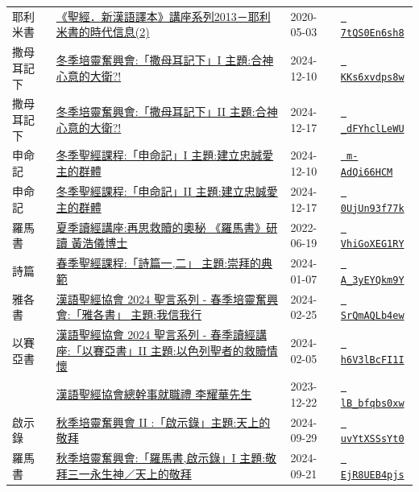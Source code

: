 \documentclass{book}
\begin{document}
{\begin{xltabular}{\textwidth}{|p{0.15\textwidth} p{0.6\textwidth}|p{0.07\textwidth} p{0.1\textwidth}|}
耶利米書   & \hyperref[sec:7tQS0En6sh8]{《聖經．新漢語譯本》講座系列2013－耶利米書的時代信息(2)} & 2020-05-03 & \href{https://youtube.com/watch?v=7tQS0En6sh8}{\texttt{ 7tQS0En6sh8}} \\
撒母耳記下   & \hyperref[sec:KKs6xvdps8w]{冬季培靈奮興會:「撒母耳記下」I  主題:合神心意的大衛?!} & 2024-12-10 & \href{https://youtube.com/watch?v=KKs6xvdps8w}{\texttt{ KKs6xvdps8w}} \\
撒母耳記下   & \hyperref[sec:_dFYhclLeWU]{冬季培靈奮興會:「撒母耳記下」II 主題:合神心意的大衛?!} & 2024-12-17 & \href{https://youtube.com/watch?v=_dFYhclLeWU}{\texttt{ \_dFYhclLeWU}} \\
申命記   & \hyperref[sec:m_AdQi66HCM]{冬季聖經課程:「申命記」I 主題:建立忠誠愛主的群體} & 2024-12-10 & \href{https://youtube.com/watch?v=m-AdQi66HCM}{\texttt{ m-AdQi66HCM}} \\
申命記   & \hyperref[sec:0UjUn93f77k]{冬季聖經課程:「申命記」II 主題:建立忠誠愛主的群體} & 2024-12-17 & \href{https://youtube.com/watch?v=0UjUn93f77k}{\texttt{ 0UjUn93f77k}} \\
羅馬書   & \hyperref[sec:VhiGoXEG1RY]{夏季讀經講座:再思救贖的奧秘 《羅馬書》研讀 黃浩儀博士} & 2022-06-19 & \href{https://youtube.com/watch?v=VhiGoXEG1RY}{\texttt{ VhiGoXEG1RY}} \\
詩篇   & \hyperref[sec:A_3yEYQkm9Y]{春季聖經課程:「詩篇一,二」 主題:崇拜的典範} & 2024-01-07 & \href{https://youtube.com/watch?v=A_3yEYQkm9Y}{\texttt{ A\_3yEYQkm9Y}} \\
雅各書   & \hyperref[sec:SrQmAQLb4ew]{漢語聖經協會 2024 聖言系列 - 春季培靈奮興會:「雅各書」 主題:我信我行} & 2024-02-25 & \href{https://youtube.com/watch?v=SrQmAQLb4ew}{\texttt{ SrQmAQLb4ew}} \\
以賽亞書   & \hyperref[sec:h6V3lBcFI1I]{漢語聖經協會 2024 聖言系列 - 春季讀經講座:「以賽亞書」II 主題:以色列聖者的救贖情懷} & 2024-02-05 & \href{https://youtube.com/watch?v=h6V3lBcFI1I}{\texttt{ h6V3lBcFI1I}} \\
    & \hyperref[sec:lB_bfqbs0xw]{漢語聖經協會總幹事就職禮 李耀華先生} & 2023-12-22 & \href{https://youtube.com/watch?v=lB_bfqbs0xw}{\texttt{ lB\_bfqbs0xw}} \\
啟示錄   & \hyperref[sec:uvYtXSSsYt0]{秋季培靈奮興會 II :「啟示錄」主題:天上的敬拜} & 2024-09-29 & \href{https://youtube.com/watch?v=uvYtXSSsYt0}{\texttt{ uvYtXSSsYt0}} \\
羅馬書   & \hyperref[sec:EjR8UEB4pjs]{秋季培靈奮興會:「羅馬書,啟示錄」I 主題:敬拜三一永生神／天上的敬拜} & 2024-09-21 & \href{https://youtube.com/watch?v=EjR8UEB4pjs}{\texttt{ EjR8UEB4pjs}} \\

\end{xltabular}}
\end{document}
